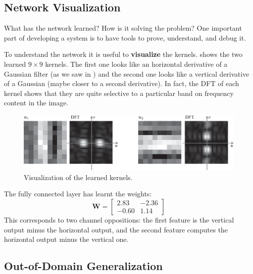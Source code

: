 \subsection{Network Visualization}

What has the network learned? How is it solving the problem? One important part of developing a system is to have tools to prove, understand, and debug it.

To understand the network it is useful to {\bf visualize} the kernels. \Fig{\ref{fig:convolutional_neural_nets:oriented_bars_cnn_kernels}} shows the two learned $9 \times 9$ kernels. The first one looks like an horizontal derivative of a Gaussian filter (as we saw in \chap{\ref{chapter:image_derivatives}}) and the second one looks like a vertical derivative of a Gaussian (maybe closer to a second derivative). In fact, the DFT of each kernel shows that they are quite selective to a particular band on frequency content in the image.

\begin{figure}
    \includegraphics[width=1.0\linewidth]{./figures/convolutional_neural_nets/oriented_bars_cnn_kernels.eps}
    \caption{Visualization of the learned kernels.}
    \label{fig:convolutional_neural_nets:oriented_bars_cnn_kernels}
\end{figure}

The fully connected layer has learnt the weights:
\begin{equation}
    \mathbf{W} =
    \left[
        \begin{array}{cc}
            2.83  & -2.36 \\
            -0.60 & 1.14
        \end{array}
        \right]
\end{equation}
This corresponds to two channel oppositions: the  first feature is the vertical output minus the horizontal output, and the second feature computes the horizontal output minus the vertical one.

\subsection{Out-of-Domain Generalization}

